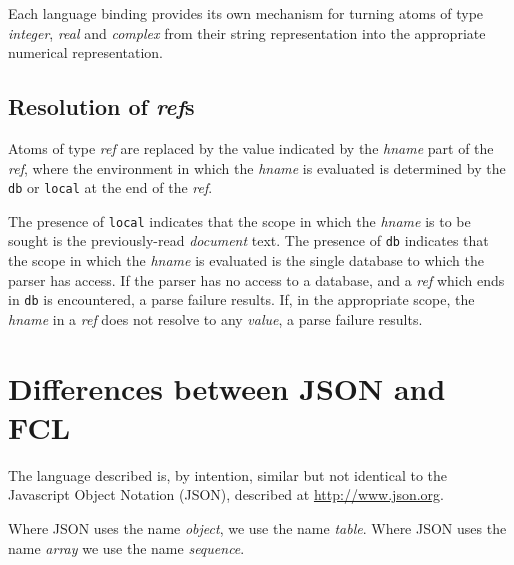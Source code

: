 \documentclass{memarticle}
\begin{document}
Each language binding
provides its own mechanism
for turning atoms of type \emph{integer}, \emph{real} and \emph{complex}
from their string representation
into the appropriate numerical representation.

\section{Resolution of \emph{ref}s\label{sec:refs}}
Atoms of type \emph{ref} are replaced
by the value indicated by the \emph{hname} part of the \emph{ref},
where the environment in which the \emph{hname} is evaluated is determined
by the \texttt{db} or \texttt{local} at the end of the \emph{ref}.

The presence of \texttt{local} indicates 
that the scope in which the \emph{hname} is to be sought
is the previously-read \emph{document} text.
The presence of \texttt{db} indicates
that the scope in which the \emph{hname} is evaluated
is the single database
to which the parser has access.
If the parser has no access to a database,
and a \emph{ref} which ends in \texttt{db} is encountered,
a parse failure results.
If,
in the appropriate scope,
the \emph{hname} in a \emph{ref} does not resolve to any \emph{value},
a parse failure results.

\appendix

\chapter{Differences between JSON and FCL\label{app:differences}}
The language described is,
by intention,
similar but not identical to the Javascript Object Notation (JSON),
described at \url{http://www.json.org}.

Where JSON uses the name \emph{object},
we use the name \emph{table}.
Where JSON uses the name \emph{array}
we use the name \emph{sequence}.
\end{document}
